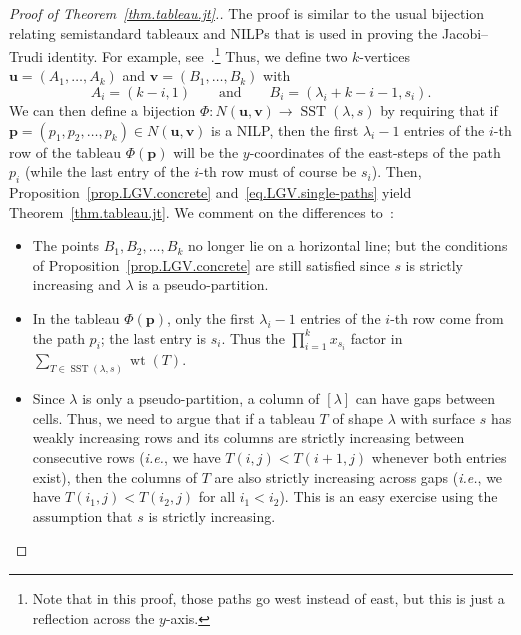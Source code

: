 \documentclass[reqno]{amsart}
\newcommand{\0}{\phantom{c}}
\newcommand{\diag}[1]{\left[#1\right]} %
\DeclareMathOperator{\wt}{wt} %
\DeclareMathOperator{\SST}{SST} %
\newcommand{\pp}{\mathbf{p}}
\newcommand{\uu}{\mathbf{u}}
\newcommand{\vv}{\mathbf{v}}
\let\sumnonlimits\sum
\let\prodnonlimits\prod
\renewcommand{\sum}{\sumnonlimits\limits}
\renewcommand{\prod}{\prodnonlimits\limits}
\newenvironment{vershort}{}{}
\newcommand{\tup}[1]{\left( #1 \right)}
\theoremstyle{plain}
\theoremstyle{definition}
\numberwithin{equation}{section}
\begin{document}
\begin{vershort}
\begin{proof}[Proof of Theorem~\ref{thm.tableau.jt}.]
The proof is similar to the usual bijection relating semistandard tableaux and NILPs that is used in proving the Jacobi--Trudi identity.
For example, see~\cite[First proof of Thm. 7.16.1]{Stanley-EC2}.\footnote{Note that in this proof, those paths go west instead of east, but this is just a reflection across the $y$-axis.}
Thus, we define two $k$-vertices $\uu = (A_1, \dotsc, A_k)$ and $\vv = (B_1, \dotsc, B_k)$ with
\[
A_i = (k-i,1)  \qquad \text{and} \qquad B_i = (\lambda_i+k-i-1, s_i).
\]
We can then define a bijection $\Phi \colon N(\uu, \vv) \to \SST(\lambda, s)$ by requiring that if $\pp = \tup{p_1, p_2, \dotsc, p_k} \in N(\uu, \vv)$ is a NILP, then the first $\lambda_i - 1$ entries of the $i$-th row of the tableau $\Phi(\pp)$ will be the $y$-coordinates of the east-steps of the path $p_i$ (while the last entry of the $i$-th row must of course be $s_i$).
Then, Proposition~\ref{prop.LGV.concrete} and~\eqref{eq.LGV.single-paths} yield Theorem~\ref{thm.tableau.jt}.
We comment on the differences to~\cite[First proof of Thm. 7.16.1]{Stanley-EC2}:
\begin{itemize}
\item The points $B_1, B_2, \ldots, B_k$ no longer lie on a horizontal line; but the conditions of Proposition~\ref{prop.LGV.concrete} are still satisfied since $s$ is strictly increasing and $\lambda$ is a pseudo-partition.
\item In the tableau $\Phi(\pp)$, only the first $\lambda_i - 1$ entries of the $i$-th row come from the path $p_i$; the last entry is $s_i$. Thus the $\prod_{i=1}^k x_{s_i}$ factor in $\sum_{T \in \SST(\lambda, s)} \wt(T)$.
\item Since $\lambda$ is only a pseudo-partition, a column of $\diag{\lambda}$ can have gaps between cells. Thus, we need to argue that if a tableau $T$ of shape $\lambda$ with surface $s$ has weakly increasing rows and its columns are strictly increasing between consecutive rows (\textit{i.e.}, we have $T(i, j) < T(i+1, j)$ whenever both entries exist), then the columns of $T$ are also strictly increasing across gaps (\textit{i.e.}, we have $T(i_1, j) < T(i_2, j)$ for all $i_1 < i_2$). This is an easy exercise using the assumption that $s$ is strictly increasing.
\end{itemize}
\end{proof}
\end{vershort}
\end{document}
